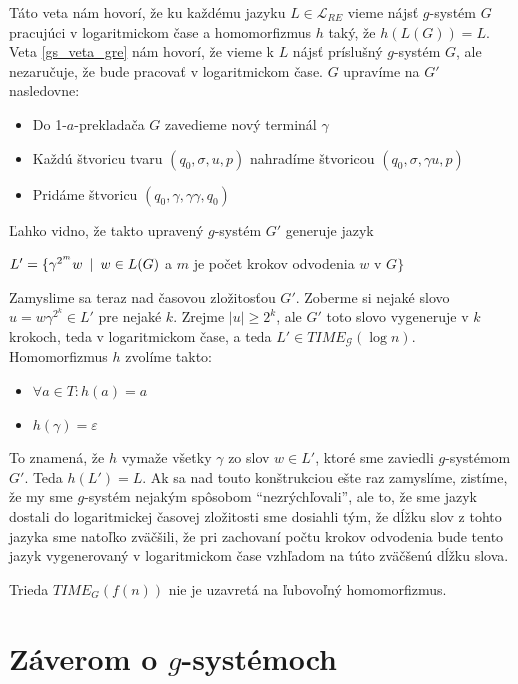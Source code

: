 \begin{dokaz}
  Táto veta nám hovorí, že ku každému jazyku $L\in\mathcal{L}_{RE}$
  vieme nájsť $g$-systém $G$ pracujúci v logaritmickom čase a
  homomorfizmus $h$ taký, že $h(L(G))=L$. Veta \ref{gs_veta_gre} nám
  hovorí, že vieme k $L$ nájsť príslušný $g$-systém $G$, ale
  nezaručuje, že bude pracovať v logaritmickom čase. $G$ upravíme na
  $G'$ nasledovne:
  \begin{itemize}
    \item Do 1-$a$-prekladača $G$ zavedieme nový terminál $\gamma$
    \item Každú štvoricu tvaru $(q_0,\sigma ,u,p)$ nahradíme štvoricou $(q_0,\sigma ,\gamma u,p)$
    \item Pridáme štvoricu $(q_0,\gamma,\gamma\gamma,q_0)$
  \end{itemize}
  Ľahko vidno, že takto upravený $g$-systém $G'$ generuje jazyk

  \centerline{$L'=\{\gamma^{2^m} w\enspace |\enspace w\in L(G)$ a $m$ je počet
  krokov odvodenia $w$ v $G\}$} Zamyslime sa teraz nad časovou
  zložitosťou $G'$. Zoberme si nejaké slovo $u=w{\gamma}^{2^k}\in
  L'$ pre nejaké $k$. Zrejme $|u|\geq 2^k$, ale $G'$ toto slovo
  vygeneruje v $k$ krokoch, teda v logaritmickom čase, a teda $L'\in
  TIME_{\mathcal{G}}(\log n)$. Homomorfizmus $h$ zvolíme takto:
  \begin{itemize}
    \item $\forall a\in T: h(a)=a$
    \item $h(\gamma)=\varepsilon$
  \end{itemize}
  To znamená, že $h$ vymaže všetky $\gamma$ zo slov $w\in L'$, ktoré
  sme zaviedli $g$-systémom $G'$. Teda $h(L')=L$. Ak sa nad touto
  konštrukciou ešte raz zamyslíme, zistíme, že my sme $g$-systém
  nejakým spôsobom ``nezrýchľovali'', ale to, že sme jazyk dostali
  do logaritmickej časovej zložitosti sme dosiahli tým, že dĺžku
  slov z tohto jazyka sme natoľko zväčšili, že pri zachovaní počtu
  krokov odvodenia bude tento jazyk vygenerovaný v logaritmickom
  čase vzhľadom na túto zväčšenú dĺžku slova.
\end{dokaz}

\begin{dosledok}
  Trieda $TIME_{G}(f(n))$ nie je uzavretá na ľubovoľný
  homomorfizmus.
\end{dosledok}

\section{Záverom o $g$-systémoch}

